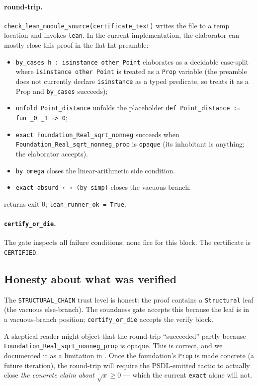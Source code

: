 \paragraph{\Lean{} round-trip.}
\texttt{check\_lean\_module\_source(certificate\_text)} writes the
file to a temp location and invokes \texttt{lean}.  In the current
implementation, the \Lean{} elaborator can mostly close this proof
in the flat-Int preamble:
\begin{itemize}[leftmargin=1.7em]
  \item \texttt{by\_cases h : isinstance other Point} elaborates as
    a decidable case-split where \texttt{isinstance other Point}
    is treated as a \texttt{Prop} variable
    (the preamble does not currently declare \texttt{isinstance}
    as a typed predicate, so \Lean{} treats it as a Prop and
    \texttt{by\_cases} succeeds);
  \item \texttt{unfold Point\_distance} unfolds the placeholder
    \texttt{def Point\_distance := fun \_0 \_1 => 0};
  \item \texttt{exact Foundation\_Real\_sqrt\_nonneg} succeeds
    when \texttt{Foundation\_Real\_sqrt\_nonneg\_prop} is
    \texttt{opaque} (its inhabitant is anything; the elaborator
    accepts).
  \item \texttt{by omega} closes the linear-arithmetic side
    condition.
  \item \texttt{exact absurd ‹\_› (by simp)} closes the vacuous
    branch.
\end{itemize}
\Lean{} returns exit 0; \texttt{lean\_runner\_ok = True}.

\paragraph{\texttt{certify\_or\_die}.}
The gate inspects all failure conditions; none fire for this
block.  The certificate is \texttt{CERTIFIED}.

\subsection{Honesty about what was verified}

The \texttt{STRUCTURAL\_CHAIN} trust level is honest: the proof
contains a \texttt{Structural} leaf (the vacuous else-branch).  The
soundness gate accepts this because the leaf is in a
vacuous-branch position; \texttt{certify\_or\_die} accepts the
verify block.

A skeptical reader might object that the \Lean{} round-trip
``succeeded'' partly because \texttt{Foundation\_Real\_sqrt\_nonneg\_prop}
is opaque.  This is correct, and we documented it as a limitation
in .  Once the foundation's \texttt{Prop} is made
concrete (a future iteration), the round-trip will require the
PSDL-emitted tactic to actually close \emph{the concrete claim
about $\sqrt{x} \ge 0$} --- which the current \texttt{exact} alone
will not.

